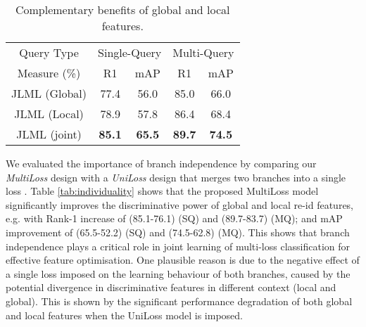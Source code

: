 \documentclass{article}
\begin{document}
\begin{table} [!h]
	\centering
	\footnotesize
\renewcommand{\arraystretch}{1}
	\setlength{\tabcolsep}{0.4 cm}
	\vspace{-0.3cm}
	\caption{\footnotesize
		Complementary benefits of global and local features.
	}
	\vskip 0pt \begin{tabular}{|c||cc|cc|}
		\hline
Query Type &  \multicolumn{2}{c|}{Single-Query} &\multicolumn{2}{c|}{Multi-Query} \\  \cline{1-5}Measure (\%)    
		& R1 & mAP & R1 & mAP  \\ \hline \hline

		JLML (Global) & 77.4 & 56.0 & 85.0 & 66.0\\   JLML (Local) &  78.9& 57.8 & 86.4 & 68.4\\ \hline
		JLML (joint) & \textbf{85.1} &  \textbf{65.5}  &  \textbf{89.7} &  \textbf{74.5} \\
		\hline
	\end{tabular}\label{tab:complementary}
	\vspace{-0.3cm}
\end{table}



\vspace{0.1cm}
We evaluated the importance of branch independence by comparing our {\em MultiLoss} design
with a {\em UniLoss} design that merges 
two branches into a single loss \cite{Cheng_TCP}.
Table \ref{tab:individuality} shows that the proposed MultiLoss model significantly
improves the discriminative power of global and local re-id features, e.g. with 
Rank-1 increase of (85.1-76.1) (SQ) and (89.7-83.7) (MQ);
and mAP improvement of (65.5-52.2) (SQ) and (74.5-62.8) (MQ).
This shows that branch independence plays a critical role in 
joint learning of multi-loss classification for effective feature optimisation.
One plausible reason is due to the negative effect of a single loss imposed
on the learning behaviour of both branches, caused by the potential divergence
in discriminative features in different context (local and global).
This is shown by the significant performance degradation of both global and local features
when the UniLoss model is imposed. 
\end{document}
